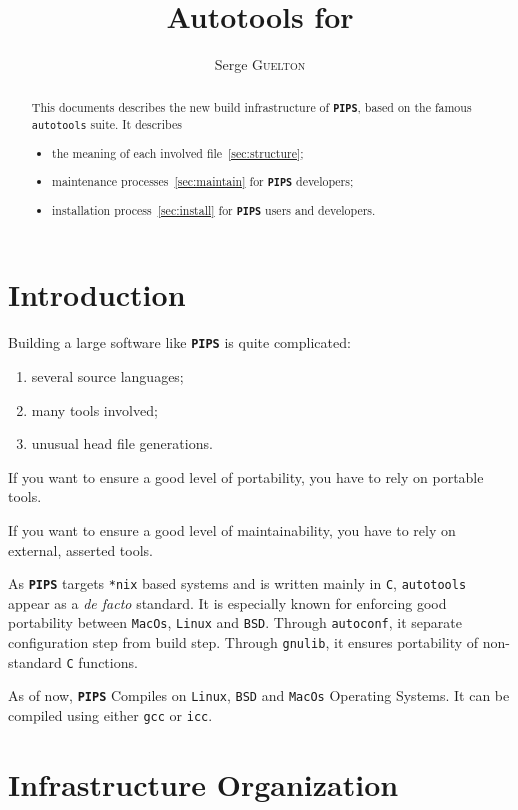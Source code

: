 \documentclass{article}
\title{Autotools for \PIPS{}}
\author{Serge \textsc{Guelton}}
\newcommand{\PIPS}{\textbf{\texttt{PIPS}}}
\newcommand{\autoconf}{\texttt{autoconf}}
\newcommand{\gnulib}{\texttt{gnulib}}
\begin{document}
\maketitle

\begin{abstract}
This documents describes the new build infrastructure of \PIPS{},
 based on the famous \texttt{autotools} suite.
It describes
\begin{itemize}
\item the meaning of each involved file~\ref{sec:structure};
\item maintenance processes~\ref{sec:maintain} for \PIPS{} developers;
\item installation process~\ref{sec:install} for \PIPS{} users and developers.
\end{itemize}
\end{abstract}

\section{Introduction}

Building a large software like \PIPS{} is quite complicated:
\begin{enumerate}
\item several source languages;
\item many tools involved;
\item unusual head file generations.
\end{enumerate}

If you want to ensure a good level of portability,
you have to rely on portable tools.

If you want to ensure a good level of maintainability,
you have to rely on external, asserted tools.

As \PIPS{} targets \texttt{*nix} based systems and is written mainly in \texttt{C},
\texttt{autotools} appear as a \textit{de facto} standard.
It is especially known for enforcing good portability between \texttt{MacOs}, \texttt{Linux} and \texttt{BSD}.
Through \autoconf{}, it separate configuration step from build step.
Through \gnulib{}, it ensures portability of non-standard \texttt{C} functions.

As of now, \PIPS{} Compiles on  \texttt{Linux}, \texttt{BSD} and \texttt{MacOs} Operating Systems.
It can be compiled using either \texttt{gcc} or \texttt{icc}.

\section{Infrastructure Organization}
\label{sec:structure}
\end{document}
